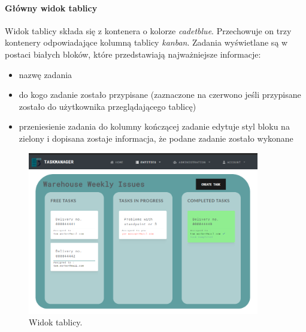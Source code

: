 \paragraph{Główny widok tablicy}
Widok tablicy składa się z kontenera o kolorze \textit{cadetblue}. Przechowuje on trzy kontenery odpowiadające kolumną tablicy \textit{kanban}.
Zadania wyświetlane są w postaci białych bloków, które przedstawiają najważniejsze informacje:
\begin{itemize}
	\item nazwę zadania
	\item do kogo zadanie zostało przypisane (zaznaczone na czerwono jeśli przypisane zostało do użytkownika przeglądającego tablicę)
	\item przeniesienie zadania do kolumny kończącej zadanie edytuje styl bloku na zielony i dopisana zostaje informacja, że podane zadanie zostało wykonane
\end{itemize}
\begin{figure}[h!]
	\centering
	\includegraphics[width=0.90\textwidth]{kanban-view}
	
	\caption{Widok tablicy.}
	\label{board}
\end{figure}
\clearpage
